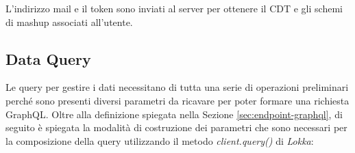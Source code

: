 L'indirizzo mail e il token sono inviati al server per ottenere il CDT e gli schemi di mashup associati all'utente.

\subsection{Data Query} \label{sec:data-query}

Le query per gestire i dati necessitano di tutta una serie di operazioni preliminari perché sono presenti diversi parametri da ricavare per poter formare una richiesta GraphQL. Oltre alla definizione spiegata nella Sezione \ref{sec:endpoint-graphql}, di seguito è spiegata la modalità di costruzione dei parametri che sono necessari per la composizione della query utilizzando il metodo \emph{client.query()} di \emph{Lokka}:

